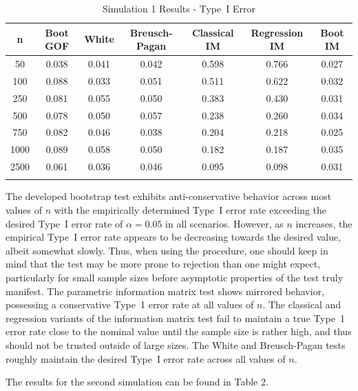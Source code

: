 \documentclass[sn-mathphys-ay]{sn-jnl}
\begin{document}
\begin{table}[h]
\caption{Simulation 1 Results - Type~I Error}\label{sim1tab}%
\begin{tabular}{ c|c|c|c|c|c|c}
\toprule
n & Boot GOF & White & Breusch-Pagan & Classical IM & Regression IM & Boot IM \\
\midrule
50 & 0.038 & 0.041 & 0.042 & 0.598 & 0.766 & 0.027 \\
100 & 0.088 & 0.033 & 0.051 & 0.511 & 0.622 & 0.032 \\
250 & 0.081 & 0.055 & 0.050 & 0.383 & 0.430 & 0.031 \\
500 & 0.078 & 0.050 & 0.057 & 0.238 & 0.260 & 0.034 \\
750 & 0.082 & 0.046 & 0.038 & 0.204 & 0.218 & 0.025 \\
1000 & 0.089 & 0.058 & 0.050 & 0.182 & 0.187 & 0.035 \\
2500 & 0.061 & 0.036 & 0.046 & 0.095 & 0.098 & 0.031 \\
\botrule
\end{tabular}

\end{table}

The developed bootstrap test exhibits anti-conservative behavior across most values of $n$ with the empirically determined Type~I error rate exceeding the desired Type~I error rate
of $\alpha = 0.05$ in all scenarios. However, as $n$ increases, the empirical Type~I error rate appears to be decreasing towards the desired value, albeit somewhat slowly. Thus, when
using the procedure, one should keep in mind that the test may be more prone to
rejection than one might expect, particularly for small sample sizes before asymptotic properties of the test truly manifest. The parametric information matrix test shows mirrored behavior,
possessing a conservative Type~1 error rate at all values of $n$. The classical and regression variants of the information matrix test fail to maintain a true Type~1 error rate close
to the nominal value until the sample size is rather high, and thus should not be trusted outside of large sizes. The White and Breusch-Pagan tests roughly maintain the desired Type~I error rate across all values of $n$.

The results for the second simulation can be found in Table 2.
\end{document}
